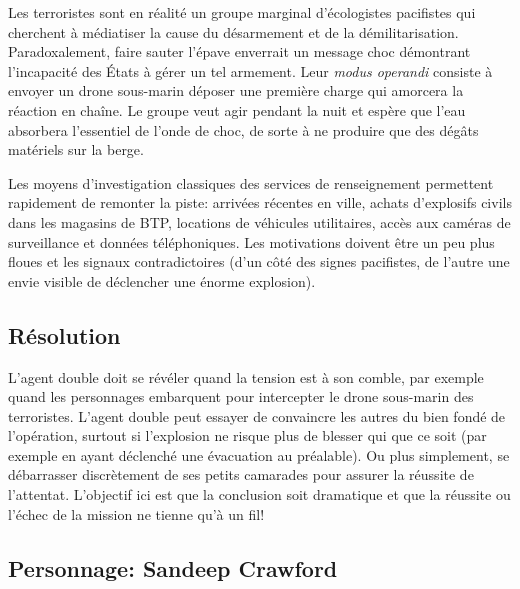 Les \og terroristes \fg sont en réalité un groupe marginal d'écologistes pacifistes qui cherchent à médiatiser la cause du désarmement et de la démilitarisation.
Paradoxalement, faire sauter l'épave enverrait un message choc démontrant l'incapacité des États à gérer un tel armement.
Leur \emph{modus operandi} consiste à envoyer un drone sous-marin déposer une première charge qui amorcera la réaction en chaîne.
Le groupe veut agir pendant la nuit et espère que l'eau absorbera l'essentiel de l'onde de choc, de sorte à ne produire que des dégâts matériels sur la berge.

Les moyens d'investigation classiques des services de renseignement permettent rapidement de remonter la piste: arrivées récentes en ville, achats d'explosifs civils dans les magasins de BTP, locations de véhicules utilitaires, accès aux caméras de surveillance et données téléphoniques.
Les motivations doivent être un peu plus floues et les signaux contradictoires (d'un côté des signes pacifistes, de l'autre une envie visible de déclencher une énorme explosion).

\subsection{Résolution}

L'agent double doit se révéler quand la tension est à son comble, par exemple quand les personnages embarquent pour intercepter le drone sous-marin des terroristes.
L'agent double peut essayer de convaincre les autres du bien fondé de l'opération, surtout si l'explosion ne risque plus de blesser qui que ce soit (par exemple en ayant déclenché une évacuation au préalable).
Ou plus simplement, se débarrasser discrètement de ses petits camarades pour assurer la réussite de l'attentat.
L'objectif ici est que la conclusion soit dramatique et que la réussite ou l'échec de la mission ne tienne qu'à un fil!

\subsection*{Personnage: Sandeep Crawford}

